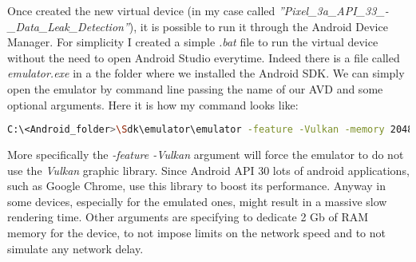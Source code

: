 			\par Once created the new virtual device (in my case called \textit{''Pixel\_3a\_API\_33\_-\_Data\_Leak\_Detection''}), it is possible to run it through the Android Device Manager. For simplicity I created a simple \textit{.bat} file to run the virtual device without the need to open Android Studio everytime. Indeed there is a file called \textit{emulator.exe} in a the folder where we installed the Android SDK. We can simply open the emulator by command line passing the name of our AVD and some optional arguments. Here it is how my command looks like:
\begin{lstlisting}[language=bash, caption={run\_AVD.bat}]
	C:\<Android_folder>\Sdk\emulator\emulator -feature -Vulkan -memory 2048 -netdelay none -netspeed full -avd Pixel_3a_API_33_-_Data_Leak_Detection
\end{lstlisting}
		\par More specifically the \textit{-feature -Vulkan} argument will force the emulator to do not use the \textit{Vulkan} graphic library. Since Android API 30 lots of android applications, such as Google Chrome, use this library to boost its performance. Anyway in some devices, especially for the emulated ones, might result in a massive slow rendering time. Other arguments are specifying to dedicate 2 Gb of RAM memory for the device, to not impose limits on the network speed and to not simulate any network delay.
			
